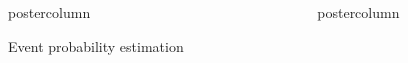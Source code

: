 \documentclass[final,hyperref={pdfpagelabels=false}]{beamer}
\newcommand*\circled[1]{\tikz[baseline=(char.base)]{
\node[shape=circle,draw,inner sep=2pt] (char) {#1};}}
\begin{document}
\begin{frame}
\begin{columns}
\begin{column}{1\textwidth}
\begin{columns}[T]
\begin{column}{.484\textwidth}
\begin{beamercolorbox}[center,wd=\textwidth]{postercolumn}
\begin{minipage}[T]{.95\textwidth}
\begin{block}{\footnotesize \circled{1} Event probability estimation}
%
%
%
\end{block}



\end{minipage}
\end{beamercolorbox}
\end{column}

\begin{column}{.484\textwidth}
\begin{beamercolorbox}[center,wd=\textwidth]{postercolumn}
\begin{minipage}[T]{.95\textwidth}  %



\end{minipage}
\end{beamercolorbox}
\end{column}
\end{columns}
\end{column}
\end{columns}
\end{frame}
\end{document}
